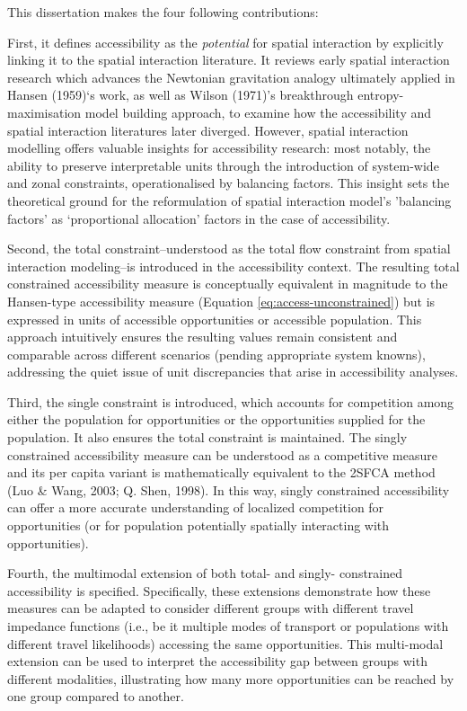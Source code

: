 \documentclass[
11pt, %
oneside, %
english, %
singlespacing, %
]{macthesis} %
\begin{document}
This dissertation makes the four following contributions:

First, it defines accessibility as the \emph{potential} for spatial interaction by explicitly linking it to the spatial interaction literature. It reviews early spatial interaction research which advances the Newtonian gravitation analogy ultimately applied in Hansen (1959)`s work, as well as Wilson (1971)'s breakthrough entropy-maximisation model building approach, to examine how the accessibility and spatial interaction literatures later diverged.
However, spatial interaction modelling offers valuable insights for accessibility research: most notably, the ability to preserve interpretable units through the introduction of system-wide and zonal constraints, operationalised by balancing factors. This insight sets the theoretical ground for the reformulation of spatial interaction model's 'balancing factors' as `proportional allocation' factors in the case of accessibility.

Second, the total constraint--understood as the total flow constraint from spatial interaction modeling--is introduced in the accessibility context. The resulting total constrained accessibility measure is conceptually equivalent in magnitude to the Hansen-type accessibility measure (Equation \ref{eq:access-unconstrained}) but is expressed in units of accessible opportunities or accessible population. This approach intuitively ensures the resulting values remain consistent and comparable across different scenarios (pending appropriate system knowns), addressing the quiet issue of unit discrepancies that arise in accessibility analyses.

Third, the single constraint is introduced, which accounts for competition among either the population for opportunities or the opportunities supplied for the population. It also ensures the total constraint is maintained. The singly constrained accessibility measure can be understood as a competitive measure and its per capita variant is mathematically equivalent to the 2SFCA method (Luo \& Wang, 2003; Q. Shen, 1998). In this way, singly constrained accessibility can offer a more accurate understanding of localized competition for opportunities (or for population potentially spatially interacting with opportunities).

Fourth, the multimodal extension of both total- and singly- constrained accessibility is specified. Specifically, these extensions demonstrate how these measures can be adapted to consider different groups with different travel impedance functions (i.e., be it multiple modes of transport or populations with different travel likelihoods) accessing the same opportunities. This multi-modal extension can be used to interpret the accessibility gap between groups with different modalities, illustrating how many more opportunities can be reached by one group compared to another.
\end{document}
